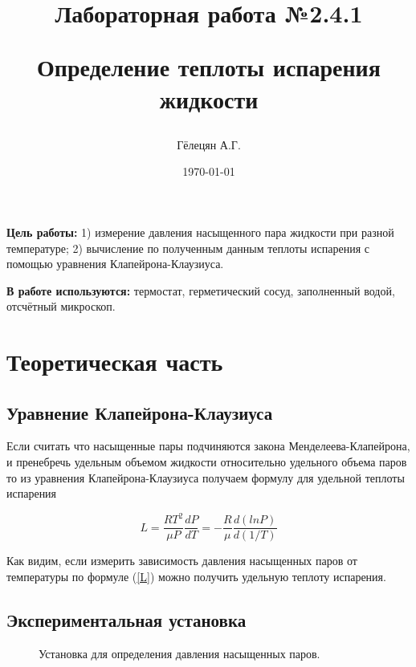 \documentclass[a4paper, 12pt]{article}
\title{\begin{center}Лабораторная работа №2.4.1\end{center}
Определение теплоты испарения жидкости}
\author{Гёлецян А.Г.}
\date{\today}
\begin{document}
    \maketitle
    \newpage


    \textbf{Цель работы:} 1) измерение давления насыщенного пара жидкости при разной температуре; 2) вычисление по полученным данным теплоты испарения с помощью уравнения Клапейрона-Клаузиуса.

    \textbf{В работе используются:} термостат, герметический сосуд, заполненный водой, отсчётный микроскоп.


    \section{Теоретическая часть}
    \subsection{Уравнение Клапейрона-Клаузиуса}
    Если считать что насыщенные пары подчиняются закона Менделеева-Клапейрона, и пренебречь удельным объемом жидкости относительно удельного объема паров то из уравнения Клапейрона-Клаузиуса получаем формулу для удельной теплоты испарения

    \begin{equation}\label{L}
        L = \frac{RT^2}{\mu P}\frac{dP}{dT} = - \frac{R}{\mu} \frac{d(ln P)}{d(1/T)}
    \end{equation}

    Как видим, если измерить зависимость давления насыщенных паров от температуры по формуле (\ref{L}) можно получить удельную теплоту испарения.
    \subsection{Экспериментальная установка}
    \begin{figure}[h]
        \caption{Установка для определения давления насыщенных паров.}
        \label{ustanovka}
    \end{figure}
\end{document}
